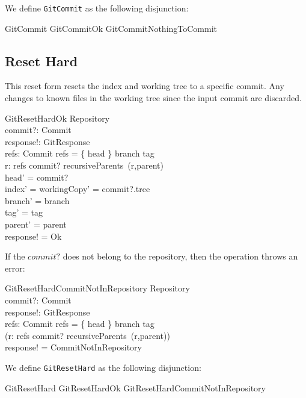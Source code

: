 We define \texttt{GitCommit} as the following disjunction:

\begin{zed}
	GitCommit  GitCommitOk \lor GitCommitNothingToCommit
\end{zed}

\subsection{Reset Hard}

This reset form resets the index and working tree to a specific commit. Any
changes to known files in the working tree since the input commit are discarded.

\begin{schema}{GitResetHardOk}
  \Delta Repository \\
  commit?: Commit \\
  response!: GitResponse \\
  refs: \finset Commit
\where
  refs = \{ head \} \cup \ran branch \cup \ran tag \\
  \exists r: refs \spot commit? \in recursiveParents~(r,parent) \\
  head' = commit? \\
  index' = workingCopy' = commit?.tree \\
  branch' = branch \\
  tag' = tag \\
  parent' = parent \\
  response! = Ok
\end{schema}

If the $commit?$ does not belong to the repository, then the operation throws
an error:

\begin{schema}{GitResetHardCommitNotInRepository}
  \Xi Repository \\
  commit?: Commit \\
  response!: GitResponse \\
  refs: \finset Commit
\where
  refs = \{ head \} \cup \ran branch \cup \ran tag \\
  \lnot (\exists r: refs \spot commit? \in recursiveParents~(r,parent)) \\
  response! = CommitNotInRepository
\end{schema}

We define \texttt{GitResetHard} as the following disjunction:

\begin{zed}
  GitResetHard  GitResetHardOk \lor GitResetHardCommitNotInRepository
\end{zed}

